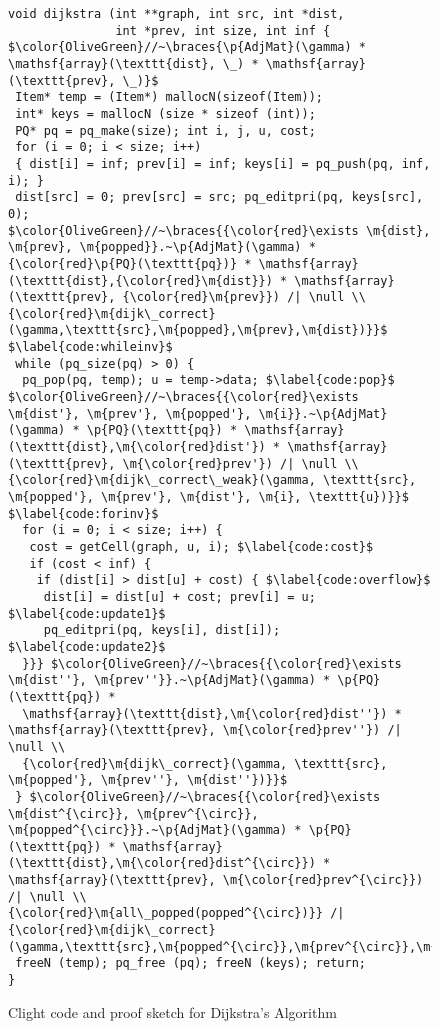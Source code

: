 
\begin{figure}[t]

\begin{lstlisting}[mathescape=true,showlines=true]
void dijkstra (int **graph, int src, int *dist, 
               int *prev, int size, int inf {
$\color{OliveGreen}//~\braces{\p{AdjMat}(\gamma) *
\mathsf{array}(\texttt{dist}, \_) * \mathsf{array}(\texttt{prev}, \_)}$
 Item* temp = (Item*) mallocN(sizeof(Item));
 int* keys = mallocN (size * sizeof (int));
 PQ* pq = pq_make(size); int i, j, u, cost;
 for (i = 0; i < size; i++) 
 { dist[i] = inf; prev[i] = inf; keys[i] = pq_push(pq, inf, i); }
 dist[src] = 0; prev[src] = src; pq_editpri(pq, keys[src], 0);
$\color{OliveGreen}//~\braces{{\color{red}\exists \m{dist}, \m{prev}, \m{popped}}.~\p{AdjMat}(\gamma) * {\color{red}\p{PQ}(\texttt{pq})} * \mathsf{array}(\texttt{dist},{\color{red}\m{dist}}) * \mathsf{array}(\texttt{prev}, {\color{red}\m{prev}}) /| \null \\
{\color{red}\m{dijk\_correct}(\gamma,\texttt{src},\m{popped},\m{prev},\m{dist})}}$ $\label{code:whileinv}$
 while (pq_size(pq) > 0) {
  pq_pop(pq, temp); u = temp->data; $\label{code:pop}$
$\color{OliveGreen}//~\braces{{\color{red}\exists \m{dist'}, \m{prev'}, \m{popped'}, \m{i}}.~\p{AdjMat}(\gamma) * \p{PQ}(\texttt{pq}) * \mathsf{array}(\texttt{dist},\m{\color{red}dist'}) * \mathsf{array}(\texttt{prev}, \m{\color{red}prev'}) /| \null \\
{\color{red}\m{dijk\_correct\_weak}(\gamma, \texttt{src}, \m{popped'}, \m{prev'}, \m{dist'}, \m{i}, \texttt{u})}}$ $\label{code:forinv}$
  for (i = 0; i < size; i++) {
   cost = getCell(graph, u, i); $\label{code:cost}$
   if (cost < inf) {
    if (dist[i] > dist[u] + cost) { $\label{code:overflow}$
     dist[i] = dist[u] + cost; prev[i] = u; $\label{code:update1}$ 
     pq_editpri(pq, keys[i], dist[i]); $\label{code:update2}$
  }}} $\color{OliveGreen}//~\braces{{\color{red}\exists \m{dist''}, \m{prev''}}.~\p{AdjMat}(\gamma) * \p{PQ}(\texttt{pq}) *
  \mathsf{array}(\texttt{dist},\m{\color{red}dist''}) * \mathsf{array}(\texttt{prev}, \m{\color{red}prev''}) /| \null \\
  {\color{red}\m{dijk\_correct}(\gamma, \texttt{src}, \m{popped'}, \m{prev''}, \m{dist''})}}$
 } $\color{OliveGreen}//~\braces{{\color{red}\exists \m{dist^{\circ}}, \m{prev^{\circ}}, \m{popped^{\circ}}}.~\p{AdjMat}(\gamma) * \p{PQ}(\texttt{pq}) * \mathsf{array}(\texttt{dist},\m{\color{red}dist^{\circ}}) * \mathsf{array}(\texttt{prev}, \m{\color{red}prev^{\circ}}) /| \null \\
{\color{red}\m{all\_popped(popped^{\circ})}} /|
{\color{red}\m{dijk\_correct}(\gamma,\texttt{src},\m{popped^{\circ}},\m{prev^{\circ}},\m{dist^{\circ}})}}$
 freeN (temp); pq_free (pq); freeN (keys); return; 
}
\end{lstlisting}
\vspace{-1em}
\caption{Clight code and proof sketch for Dijkstra's Algorithm}
\vspace{-1em}
\label{fig:decorated}
\end{figure} 